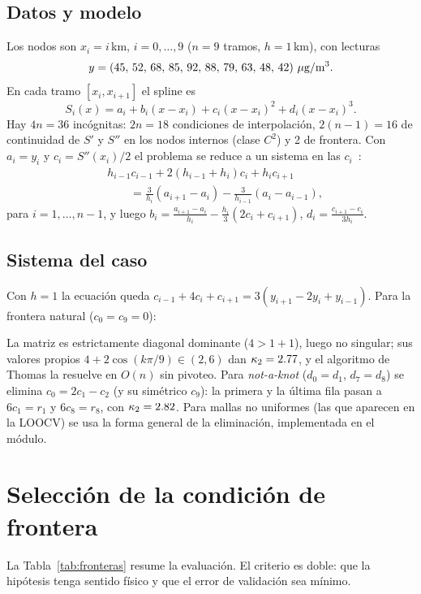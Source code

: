 \documentclass[conference,a4paper]{IEEEtran}
\newcommand{\ugm}{\ensuremath{\mu}g/m\textsuperscript{3}}
\newcommand{\nak}{\emph{not-a-knot}}
\begin{document}
\subsection{Datos y modelo}
Los nodos son $x_i=i$\,km, $i=0,\dots,9$ ($n=9$ tramos, $h=1$\,km), con lecturas
\[ y=(45,\,52,\,68,\,85,\,92,\,88,\,79,\,63,\,48,\,42)\ \text{\ugm}. \]
En cada tramo $[x_i,x_{i+1}]$ el spline es
\begin{equation}
S_i(x)=a_i+b_i(x-x_i)+c_i(x-x_i)^2+d_i(x-x_i)^3 .
\end{equation}
Hay $4n=36$ incógnitas: $2n=18$ condiciones de interpolación, $2(n-1)=16$ de continuidad de $S'$ y
$S''$ en los nodos internos (clase $C^2$) y 2 de frontera. Con $a_i=y_i$ y $c_i=S''(x_i)/2$ el problema se
reduce a un sistema en las $c_i$~\cite{burden2017}:
\begin{equation}
\begin{aligned}
&h_{i-1}c_{i-1}+2(h_{i-1}+h_i)c_i+h_ic_{i+1}\\
&\qquad=\tfrac{3}{h_i}(a_{i+1}-a_i)-\tfrac{3}{h_{i-1}}(a_i-a_{i-1}),
\end{aligned}
\end{equation}
para $i=1,\dots,n-1$, y luego $b_i=\frac{a_{i+1}-a_i}{h_i}-\frac{h_i}{3}(2c_i+c_{i+1})$,
$d_i=\frac{c_{i+1}-c_i}{3h_i}$.

\subsection{Sistema del caso}
Con $h=1$ la ecuación queda $c_{i-1}+4c_i+c_{i+1}=3(y_{i+1}-2y_i+y_{i-1})$. Para la frontera natural
($c_0=c_9=0$):

La matriz es estrictamente diagonal dominante ($4>1+1$), luego no singular; sus valores propios
$4+2\cos(k\pi/9)\in(2,6)$ dan $\kappa_2=2.77$, y el algoritmo de Thomas la resuelve en $O(n)$ sin
pivoteo. Para \nak{} ($d_0=d_1$, $d_7=d_8$) se elimina $c_0=2c_1-c_2$ (y su simétrico $c_9$): la primera y
la última fila pasan a $6c_1=r_1$ y $6c_8=r_8$, con $\kappa_2=2.82$. Para mallas no uniformes (las que
aparecen en la LOOCV) se usa la forma general de la eliminación, implementada en el módulo.

\section{Selección de la condición de frontera}
La Tabla~\ref{tab:fronteras} resume la evaluación. El criterio es doble: que la hipótesis tenga sentido
físico y que el error de validación sea mínimo.
\end{document}
